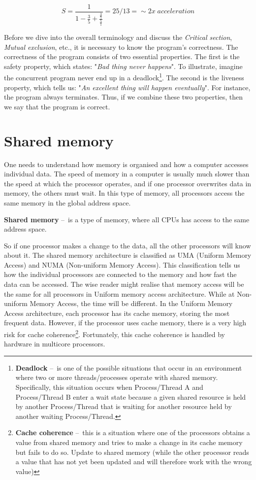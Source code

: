 \begin{equation}
    \label{eqn:amdalhinpractice}
    S = \frac{1}{1 - \frac{3}{5} + \frac{\frac{3}{5}}{\frac{5}{1}}} = 25/13 =\sim 2x \; acceleration
    \tag{2}
\end{equation}

Before we dive into the overall terminology and discuss the \emph{Critical section}, \emph{Mutual exclusion}, etc., it is necessary to know the program's correctness.
The correctness of the program consists of two essential properties.
The first is the safety property, which states: "\emph{Bad thing never happens}". To illustrate, imagine the concurrent program never end up in a deadlock\footnote{\textbf{Deadlock} \---\ is one of the possible situations that occur in an environment where two or more threads/processes operate with shared memory. Specifically, this situation occurs when Process/Thread A and Process/Thread B enter a wait state because a given shared resource is held by another Process/Thread that is waiting for another resource held by another waiting Process/Thread.}.
The second is the liveness property, which tells us: "\emph{An excellent thing will happen eventually}". For instance, the program always terminates.
Thus, if we combine these two properties, then we say that the program is correct.

\section{Shared memory}
\label{04:sharedmemory}

One needs to understand how memory is organised and how a computer accesses individual data.
The speed of memory in a computer is usually much slower than the speed at which the processor operates, and if one processor overwrites data in memory, the others must wait.
In this type of memory, all processors access the same memory in the global address space.
\begin{definition}
    \textbf{Shared memory} \---\ is a type of memory, where all CPUs has access to the same address space.
\end{definition}
So if one processor makes a change to the data, all the other processors will know about it.
The shared memory architecture is classified as UMA (Uniform Memory Access) and NUMA (Non-uniform Memory Access).
This classification tells us how the individual processors are connected to the memory and how fast the data can be accessed.
The wise reader might realise that memory access will be the same for all processors in Uniform memory access architecture.
While at Non-uniform Memory Access, the time will be different.
In the Uniform Memory Access architecture, each processor has its cache memory, storing the most frequent data.
However, if the processor uses cache memory, there is a very high risk for cache coherence\footnote {\textbf{Cache coherence} \---\ this is a situation where one of the processors obtains a value from shared memory and tries to make a change in its cache memory but fails to do so. Update to shared memory (while the other processor reads a value that has not yet been updated and will therefore work with the wrong value)}. Fortunately, this cache coherence is handled by hardware in multicore processors.

